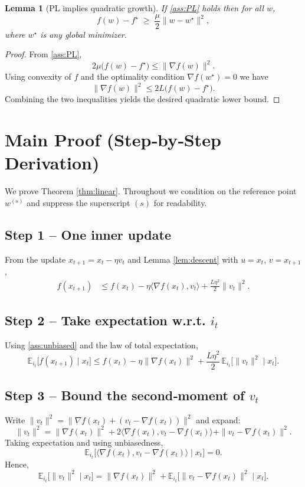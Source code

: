 \documentclass{article}
\newtheorem{lemma}{Lemma}
\begin{document}
\begin{lemma}[PL implies quadratic growth]\label{lem:PLquad}
If \ref{ass:PL} holds then for all $w$,
\[
f(w)-f^\star\;\ge\;\frac{\mu}{2}\|w-w^\star\|^2 ,
\]
where $w^\star$ is any global minimizer.
\end{lemma}
\begin{proof}
From \ref{ass:PL},
\[
2\mu\bigl(f(w)-f^\star\bigr)\le\|\nabla f(w)\|^2 .
\]
Using convexity of $f$ and the optimality condition $\nabla f(w^\star)=0$ we have
\[
\|\nabla f(w)\|^2\le 2L\bigl(f(w)-f^\star\bigr) .
\]
Combining the two inequalities yields the desired quadratic lower bound. \qedhere
\end{proof}

\section*{Main Proof (Step‑by‑Step Derivation)}
We prove Theorem \ref{thm:linear}. Throughout we condition on the reference point $w^{(s)}$ and suppress the superscript $(s)$ for readability.

\subsection*{Step 1 – One inner update}
From the update $x_{t+1}=x_t-\eta v_t$ and Lemma \ref{lem:descent} with $u=x_t$, $v=x_{t+1}$,
\[
\begin{aligned}
f(x_{t+1})
&\le f(x_t)-\eta\langle\nabla f(x_t),v_t\rangle
      +\frac{L\eta^2}{2}\|v_t\|^2 .
\end{aligned}
\tag{3}
\]

\subsection*{Step 2 – Take expectation w.r.t. $i_t$}
Using \ref{ass:unbiased} and the law of total expectation,
\[
\mathbb{E}_{i_t}\!\bigl[f(x_{t+1})\mid x_t\bigr]
\le f(x_t)-\eta\|\nabla f(x_t)\|^2
   +\frac{L\eta^2}{2}\,\mathbb{E}_{i_t}\!\bigl[\|v_t\|^2\mid x_t\bigr].
\tag{4}
\]

\subsection*{Step 3 – Bound the second‑moment of $v_t$}
Write $\|v_t\|^2=\|\nabla f(x_t)+(v_t-\nabla f(x_t))\|^2$ and expand:
\[
\|v_t\|^2
= \|\nabla f(x_t)\|^2
  +2\langle\nabla f(x_t),v_t-\nabla f(x_t)\rangle
  +\|v_t-\nabla f(x_t)\|^2 .
\]
Taking expectation and using unbiasedness,
\[
\mathbb{E}_{i_t}\!\bigl[\langle\nabla f(x_t),v_t-\nabla f(x_t)\rangle\mid x_t\bigr]=0 .
\]
Hence,
\[
\mathbb{E}_{i_t}\!\bigl[\|v_t\|^2\mid x_t\bigr]
= \|\nabla f(x_t)\|^2
  +\mathbb{E}_{i_t}\!\bigl[\|v_t-\nabla f(x_t)\|^2\mid x_t\bigr].
\tag{5}
\]
\end{document}
